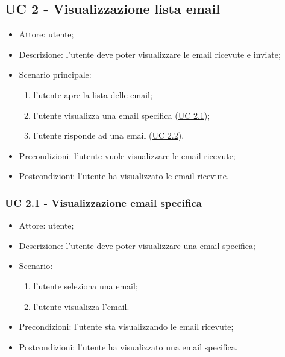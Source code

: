     \subsection{UC 2 - Visualizzazione lista email}  \label{sec: UC 2}
    \begin{itemize}
        \item Attore: utente;
        \item Descrizione: l'utente deve poter visualizzare le email ricevute e inviate;
        \item Scenario principale:
            \begin{enumerate}
            \item l’utente apre la lista delle email;
            \item l'utente visualizza una email specifica (\hyperref[sec: UC 2.1]{UC 2.1});
            \item l’utente risponde ad una email (\hyperref[sec: UC 2.2]{UC 2.2}).
            \end{enumerate}
        \item Precondizioni: l'utente vuole visualizzare le email ricevute;
        \item Postcondizioni: l'utente ha visualizzato le email ricevute.
    \end{itemize}

    \subsubsection{UC 2.1 - Visualizzazione email specifica} \label{sec: UC 2.1}
    \begin{itemize}
        \item Attore: utente;
        \item Descrizione: l'utente deve poter visualizzare una email specifica;
        \item Scenario:
        \begin{enumerate}
        \item l'utente seleziona una email;
        \item l'utente visualizza l'email.
        \end{enumerate}
        \item Precondizioni: l'utente sta visualizzando le email ricevute;
        \item Postcondizioni: l'utente ha visualizzato una email specifica.
    \end{itemize}

